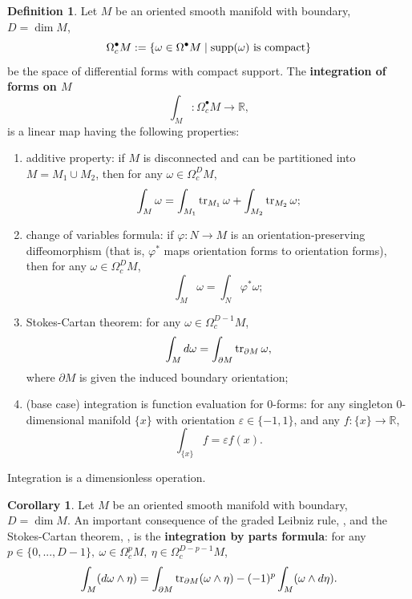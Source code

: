 \documentclass{elsarticle}
\theoremstyle{definition}
\newtheorem{corollary}[theorem]{Corollary}
\newtheorem{definition}[theorem]{Definition}
\newcommand{\tr}{\mathop{\rm tr}\nolimits}
\newcommand{\R}{\mathbb{R}}
\newcommand{\newterm}[1]{\textbf{#1}}
\begin{document}
\begin{definition}
  Let $M$ be an oriented smooth manifold with boundary, $D = \dim M$,
  \begin{equation}
    \Omega^\bullet_c M := \{\omega \in \Omega^\bullet M \mid {\rm supp}(\omega)\ \textrm{is compact}\}
  \end{equation}
  be the space of differential forms with compact support.
  The \newterm{integration of forms on $M$}
  \begin{equation}
    \int_M \colon \Omega^\bullet_c M \to \R,
  \end{equation}
  is a linear map having the following properties:
  \begin{enumerate}
    \item
      additive property:
      if $M$ is disconnected and can be partitioned into $M = M_1 \cup M_2$, then for any $\omega \in \Omega^D_c M$,
      \begin{equation}
        \int_M \omega = \int_{M_1} \tr_{M_1} \omega + \int_{M_2} \tr_{M_2} \omega;
      \end{equation}
    \item
      change of variables formula: if $\varphi \colon N \to M$ is an orientation-preserving diffeomorphism (that is, $\varphi^*$ maps orientation forms to orientation forms), then for any $\omega \in \Omega^D_c M$,
      \begin{equation}
        \int_M \omega = \int_N \varphi^* \omega;
      \end{equation}
    \item
      Stokes-Cartan theorem: for any $\omega \in \Omega^{D - 1}_c M$,
      \begin{equation}
        \label{eq:exterior_calculus/stokes_cartan}
        \int_M d \omega = \int_{\partial M} \tr_{\partial M} \omega,
      \end{equation}
      where $\partial M$ is given the induced boundary orientation;
    \item
      (base case) integration is function evaluation for $0$-forms: for any singleton $0$-dimensional manifold $\{x\}$ with orientation $\varepsilon \in \{-1, 1\}$, and any $f \colon \{x\} \to \R$,
      \begin{equation}
        \int_{\{x\}} f = \varepsilon f(x).
      \end{equation}
  \end{enumerate}
  Integration is a dimensionless operation.
\end{definition}
\begin{corollary}
  Let $M$ be an oriented smooth manifold with boundary, $D = \dim M$.
  An important consequence of the graded Leibniz rule, , and the Stokes-Cartan theorem, , is the \newterm{integration by parts formula}:
  for any $p \in \{0, ..., D - 1\},\ \omega \in \Omega^p_c M,\ \eta \in \Omega^{D - p - 1}_c M$,
  \begin{equation}
    \int_M (d \omega \wedge \eta) = \int_{\partial M} \tr_{\partial M}(\omega \wedge \eta) - (-1)^p \int_M (\omega \wedge d \eta).
  \end{equation}
\end{corollary}
\end{document}
